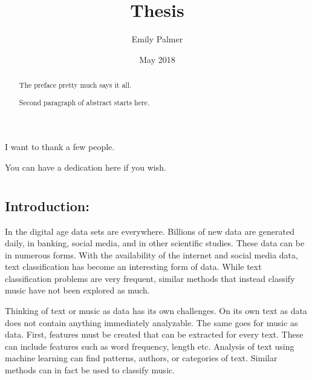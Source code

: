 \documentclass[12pt,twoside]{reedthesis}
\title{Thesis}
\author{Emily Palmer}
\date{May 2018}
\theoremstyle{definition}
\theoremstyle{definition}
\theoremstyle{definition}
\theoremstyle{remark}
\begin{document}
  \maketitle

\frontmatter %
\pagestyle{empty} %
  \begin{acknowledgements}
    I want to thank a few people.
  \end{acknowledgements}

  \hypersetup{linkcolor=black}
  \setcounter{tocdepth}{2}
  \tableofcontents

  \listoftables

  \listoffigures
  \begin{abstract}
    The preface pretty much says it all. \par
    
    Second paragraph of abstract starts here.
  \end{abstract}
  \begin{dedication}
    You can have a dedication here if you wish.
  \end{dedication}
\mainmatter %
\pagestyle{fancyplain} %

\chapter{}\label{section}

\section{Introduction:}\label{introduction}

In the digital age data sets are everywhere. Billions of new data are
generated daily, in banking, social media, and in other scientific
studies. These data can be in numerous forms. With the availability of
the internet and social media data, text classification has become an
interesting form of data. While text classification problems are very
frequent, similar methods that instead classify music have not been
explored as much.

Thinking of text or music as data has its own challenges. On its own
text as data does not contain anything immediately analyzable. The same
goes for music as data. First, features must be created that can be
extracted for every text. These can include features such as word
frequency, length etc. Analysis of text using machine learning can find
patterns, authors, or categories of text. Similar methods can in fact be
used to classify music.
\end{document}
